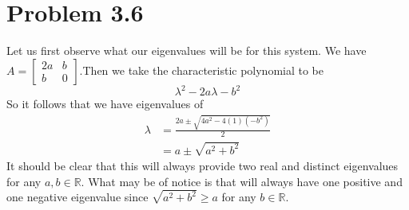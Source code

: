 \documentclass{article}
\theoremstyle{definition}
\begin{document}
\section*{Problem 3.6}
Let us first observe what our eigenvalues will be for this system.
We have $A =\begin{bmatrix}
    2a&b\\b&0
\end{bmatrix}$.Then we take the characteristic polynomial to be 
\[
    \lambda^2 - 2 a \lambda - b^2
\]
So it follows that we have eigenvalues of 
\begin{align*}
    \lambda & = \frac{2a \pm \sqrt{4a^2 - 4(1)(-b^2)}}{2} \\
    &= a \pm \sqrt{a^2 + b^2}
\end{align*}
It should be clear that this will always provide two real and distinct eigenvalues for any $a, b \in \mathbb{R}$.
What may be of notice is that will always have one positive and one negative eigenvalue since $\sqrt{a^2 + b^2} \geqslant a$ for any $b \in \mathbb{R}$.
\end{document}

